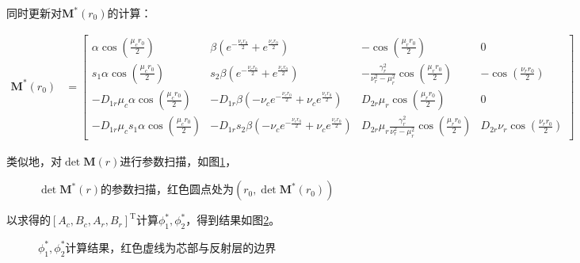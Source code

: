 同时更新对$\pmb{M}^*(r_0)$的计算：

\begin{align}
    \pmb{M}^*(r_0) &= 
    \begin{bmatrix}
        \alpha\cos(\frac{\mu_c r_0}{2}) & \beta(e^{-\frac{\nu_c r_0}{2}}+e^{\frac{\nu_c r_0}{2}}) & -\cos(\frac{\mu_r r_0}{2}) & 0 \\
        s_1\alpha\cos(\frac{\mu_c r_0}{2}) & s_2\beta(e^{-\frac{\nu_c r_0}{2}}+e^{\frac{\nu_c r_0}{2}}) & -\frac{\gamma_r^2}{\nu_r^2 - \mu_r^2}\cos(\frac{\mu_r r_0}{2}) & -\cos(\frac{\nu_r r_0}{2}) \\
        -D_{1r}\mu_c\alpha\cos(\frac{\mu_c r_0}{2}) & -D_{1r}\beta(-\nu_c e^{-\frac{\nu_c r_0}{2}}+\nu_c e^{\frac{\nu_c r_0}{2}}) & D_{2r}\mu_r \cos(\frac{\mu_r r_0}{2}) & 0 \\
        -D_{1r}\mu_c s_1\alpha\cos(\frac{\mu_c r_0}{2}) & -D_{1r}s_2\beta(-\nu_c e^{-\frac{\nu_c r_0}{2}}+\nu_c e^{\frac{\nu_c r_0}{2}}) & D_{2r}\mu_r\frac{\gamma_r^2}{\nu_r^2 - \mu_r^2}\cos(\frac{\mu_r r_0}{2}) & D_{2r}\nu_r \cos(\frac{\nu_r r_0}{2})
    \end{bmatrix}
\end{align}

类似地，对$\det \pmb{M}(r)$进行参数扫描，如图\ref{fig:det_M_adjoint}，

\begin{figure}[H]
    \centering
    
    \caption{$\det \pmb{M}^*(r)$的参数扫描，红色圆点处为$\left(r_0,\det \pmb{M}^*(r_0)\right)$}
    \label{fig:det_M_adjoint}
\end{figure}

以求得的$\left[A_c,B_c,A_r,B_r\right]^{\mathrm{T}}$计算$\phi_1^*,\phi_2^*$，得到结果如图\ref{fig:flux_r_adjoint}。

\begin{figure}[H]
    \centering
    
    \caption{$\phi_1^*,\phi_2^*$计算结果，红色虚线为芯部与反射层的边界}
    \label{fig:flux_r_adjoint}
\end{figure}
